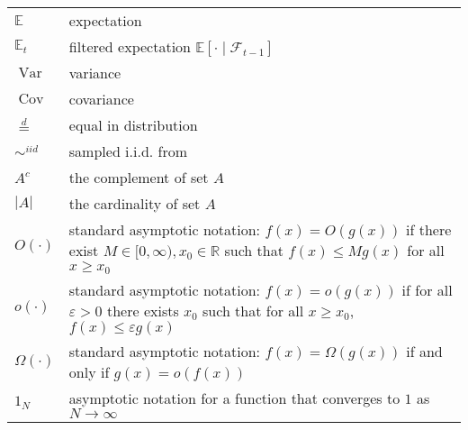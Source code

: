 \documentclass[oneside]{scrbook} %
\newcommand{\seb}[1]{\xspace\textcolor{red}{#1}\xspace} %
\theoremstyle{definition}
\newcommand{\E}{\mathbb{E}}
\newcommand{\Et}{\mathbb{E}_t}
\newcommand{\V}{\operatorname{Var}}
\newcommand{\Cov}{\operatorname{Cov}}
\newcommand{\ON}{1_N}
\newcommand{\eqdist}{\overset{d}{=}}
\newcommand{\simiid}{\sim^{iid}}%
\newcommand{\1}[1]{\mathbbm{1}_{#1}} %
\begin{document}
\begin{longtable}{p{} p{}}
$\E$ & expectation \\
$\Et$ & filtered expectation $\E[ \cdot \mid \mathcal{F}_{t-1}]$\\
$\V$ & variance \\
$\Cov$ & covariance \\
$\eqdist$ & equal in distribution \\
$\simiid$ & sampled i.i.d. from \\
$A^c$ & the complement of set $A$\\
$|A|$ & the cardinality of set $A$\\
$O(\cdot)$ & standard asymptotic notation: $f(x) = O(g(x))$ if there exist $M\in[0,\infty), x_0 \in \mathbb{R}$ such that $f(x) \leq Mg(x)$ for all $x\geq x_0$ \\
$o(\cdot)$ & standard asymptotic notation: $f(x) = o(g(x))$ if for all $\varepsilon>0$ there exists $x_0$ such that for all $x\geq x_0$, $f(x) \leq \varepsilon g(x)$ \\
$\Omega(\cdot)$ & standard asymptotic notation: $f(x) = \Omega(g(x))$ if and only if $g(x) = o(f(x))$ \\
$\ON$ & asymptotic notation for a function that converges to $1$ as $N\to\infty$ \\
\end{longtable}


\mainmatter











\backmatter


\printbibliography
\end{document}
